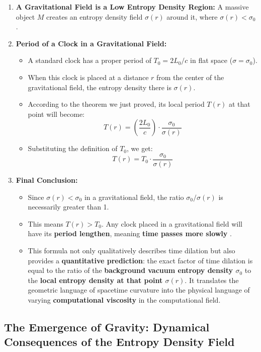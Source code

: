 \documentclass[11pt, a4paper]{article}
\begin{document}
\begin{enumerate}
    \item \textbf{A Gravitational Field is a Low Entropy Density Region:} A massive object $M$ creates an entropy density field $\sigma(r)$ around it, where $\sigma(r) < \sigma_0$.
    \item \textbf{Period of a Clock in a Gravitational Field:}
    \begin{itemize}
        \item A standard clock has a proper period of $T_0 = 2L_0 / c$ in flat space ($\sigma=\sigma_0$).
        \item When this clock is placed at a distance $r$ from the center of the gravitational field, the entropy density there is $\sigma(r)$.
        \item According to the theorem we just proved, its local period $T(r)$ at that point will become:
        \[
        T(r) = \left(\frac{2L_0}{c}\right) \cdot \frac{\sigma_0}{\sigma(r)}
        \]
        \item Substituting the definition of $T_0$, we get:
        \[
        T(r) = T_0 \cdot \frac{\sigma_0}{\sigma(r)}
        \]
    \end{itemize}
    \item \textbf{Final Conclusion:}
    \begin{itemize}
        \item Since $\sigma(r) < \sigma_0$ in a gravitational field, the ratio $\sigma_0 / \sigma(r)$ is necessarily greater than 1.
        \item This means $T(r) > T_0$. Any clock placed in a gravitational field will have its \textbf{period lengthen}, meaning \textbf{time passes more slowly} \cite{Einstein1905}.
        \item This formula not only qualitatively describes time dilation but also provides a \textbf{quantitative prediction}: the exact factor of time dilation is equal to the ratio of the \textbf{background vacuum entropy density $\sigma_0$} to the \textbf{local entropy density at that point $\sigma(r)$}. It translates the geometric language of spacetime curvature into the physical language of varying \textbf{computational viscosity} in the computational field.
    \end{itemize}
\end{enumerate}

\subsection{The Emergence of Gravity: Dynamical Consequences of the Entropy Density Field}
\end{document}
